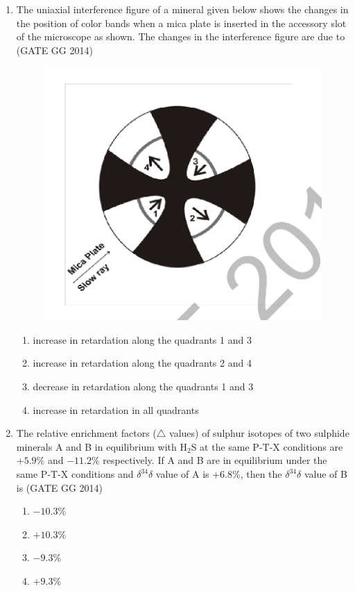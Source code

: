 \documentclass[journal]{IEEEtran}
\begin{document}
\begin{enumerate}[start=1]
\item The uniaxial interference figure of a mineral given below shows the changes in the position of color bands when a mica plate is inserted in the accessory slot of the microscope as shown. The changes in the interference figure are due to\\
\hspace*{15.7cm}(GATE GG 2014)
\begin{figure}[H]
    \centering
    \includegraphics[width=0.5\columnwidth]{figs/03.png} 
    \caption{}
    \label{fig:48}
\end{figure}
\begin{enumerate}
    \item  increase in retardation along the quadrants 1 and 3
\item  increase in retardation along the quadrants 2 and 4
\item  decrease in retardation along the quadrants 1 and 3
\item  increase in retardation in all quadrants

\end{enumerate}

\item The relative enrichment factors ($\triangle$ values) of sulphur isotopes of two sulphide minerals A and B in equilibrium with H$_2$S at the same P-T-X conditions are $+5.9\%$ and $-11.2\%$ respectively. If A and B are in equilibrium under the same P-T-X conditions and $\delta^{34}\delta$ value of A is +6.8\%, then the $\delta^{34}\delta$ value of B is
\hfill(GATE GG 2014)

    \begin{enumerate}
    \item  $-10.3\%$
\item  $+10.3\%$
\item $-9.3\%$
 \item $+9.3\%$
\end{enumerate}


\end{enumerate}
\end{document}
